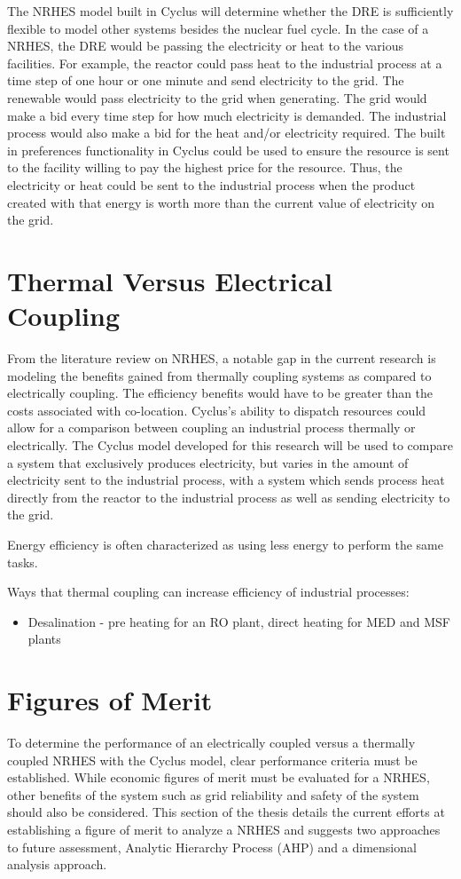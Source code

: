 \documentclass[12pt]{UIdahoMastersThesis}
\begin{document}
The NRHES model built in Cyclus will determine whether the DRE is sufficiently flexible to model other systems besides the nuclear fuel cycle.  In the case of a NRHES, the DRE would be passing the electricity or heat to the various facilities.  For example, the reactor could  pass heat to the industrial process at a time step of one hour or one minute and send electricity to the grid.  The renewable would pass electricity to the grid when generating.  The grid would make a bid every time step for how much electricity is demanded.  The industrial process would also make a bid for the heat and/or electricity required.  The built in preferences functionality in Cyclus could be used to ensure the resource is sent to the facility willing to pay the highest price for the resource.  Thus, the electricity or heat could be sent to the industrial process when the product created with that energy is worth more than the current value of electricity on the grid.
\chapter{Thermal Versus Electrical Coupling}
From the literature review on NRHES, a notable gap in the current research is modeling the benefits gained from thermally coupling systems as compared to electrically coupling.  The efficiency benefits would have to be greater than the costs associated with co-location.  Cyclus's ability to dispatch resources could allow for a comparison between coupling an industrial process thermally or electrically. The Cyclus model developed for this research will be used to compare a system that exclusively produces electricity, but varies in the amount of electricity sent to the industrial process, with a system which sends process heat directly from the reactor to the industrial process as well as sending electricity to the grid.

Energy efficiency is often characterized as using less energy to perform the same tasks.

Ways that thermal coupling can increase efficiency of industrial processes:
\begin{itemize}
\item Desalination - pre heating for an RO plant, direct heating for MED and MSF plants
\end{itemize}


\chapter{Figures of Merit}
To determine the performance of an electrically coupled versus a thermally coupled NRHES with the Cyclus model, clear performance criteria must be established.  While economic figures of merit must be evaluated for a NRHES, other benefits of the system such as grid reliability and safety of the system should also be considered. This section of the thesis details the current efforts at establishing a figure of merit to analyze a NRHES and suggests two approaches to future assessment, Analytic Hierarchy Process (AHP) and a dimensional analysis approach.
\end{document}
